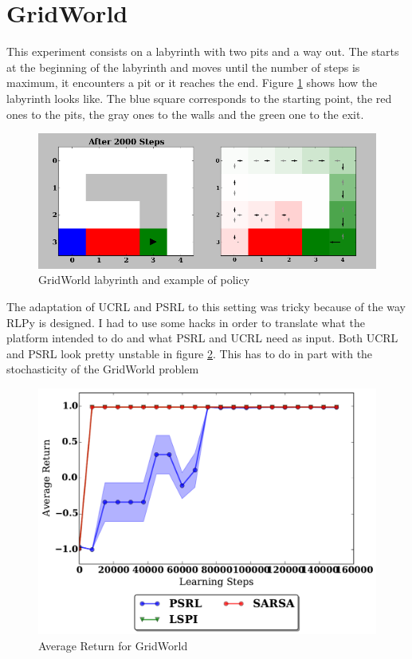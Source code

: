 \documentclass[12pt]{article}
\begin{document}
\FloatBarrier
\section{GridWorld}
This experiment consists on a labyrinth with two pits and a way out. The starts at the beginning of the labyrinth and moves until the number of steps is maximum, it encounters a pit or it reaches the end. Figure \ref{fig:GW} shows how the labyrinth looks like. The blue square corresponds to the starting point, the red ones to the pits, the gray ones to the walls and the green one to the exit.

\begin{figure}[h]
\centering
\includegraphics[trim=0cm 0cm 0cm 1.1cm, clip=true, scale=.4]{gridWorld.png}
\caption{GridWorld labyrinth and example of policy}
\label{fig:GW}
\end{figure}

The adaptation of UCRL and PSRL to this setting was tricky because of the way RLPy is designed. I had to use some hacks in order to translate what the platform intended to do and what PSRL and UCRL need as input. Both UCRL and PSRL look pretty unstable in figure \ref{fig:res_grid}. This has to do in part with the stochasticity of the GridWorld problem

\begin{figure}[h]
\centering
\includegraphics[scale=.4]{Grid.pdf}
\caption{Average Return for GridWorld}
\label{fig:res_grid}
\end{figure}
\end{document}
